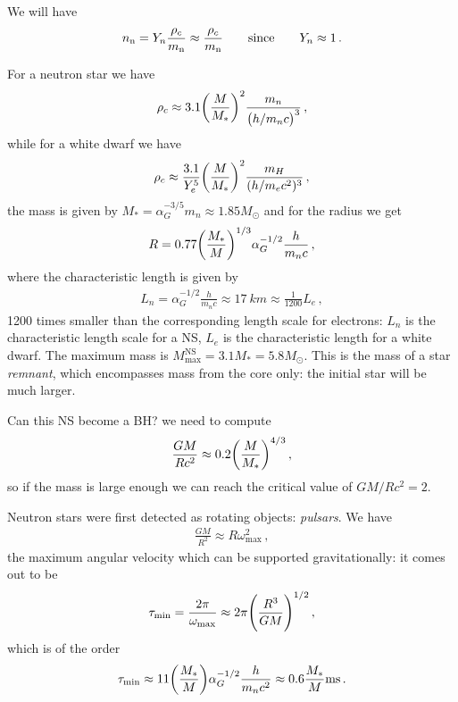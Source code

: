 \documentclass[main.tex]{subfiles}
\begin{document}
We will have 
%
\begin{align}
n_{\ce{n}} = Y_n \frac{\rho_{c}}{m_{\ce{n}}} \approx \frac{\rho_{c}}{m_{\ce{n}}} \qquad \text{since} \qquad Y_n \approx 1
\,.
\end{align}

For a neutron star we have 
%
\begin{align}
\rho_{c} \approx 3.1 \qty(\frac{M}{M_{*}})^2 \frac{m_n}{\qty(h / m_n c)^3}
\,,
\end{align}
%
while for a white dwarf we have 
%
\begin{align}
\rho_{c} \approx \frac{3.1}{Y_e^{5}} \qty(\frac{M}{M_{*}})^2 \frac{m_H}{(h / m_e c^2)^{3}}
\,,
\end{align}
%
the mass is given by \(M_{*} = \alpha_{G}^{-3 /5 } m_n \approx 1.85 M_{\odot}\) and for the radius we get 
%
\begin{align}
R = \num{.77} \qty(\frac{M_{*}}{M})^{1/3} \alpha_{G}^{-1/2}  \frac{h}{m_n c}
\,,
\end{align}
%
where the characteristic length is given by 
%
\begin{align}
L_n = \alpha_{G}^{-1/2} \frac{h}{m_n c} \approx \SI{17}{km} \approx \frac{1}{1200} L_e
\,,
\end{align}
%
1200 times smaller than the corresponding length scale for electrons: \(L_n\) is the characteristic length scale for a NS, \(L_e\) is the characteristic length for a white dwarf.
The maximum mass is \(M _{\text{max}}^{\text{NS}} = 3.1 M_{*} = 5.8 M_{\odot}\). 
This is the mass of a star \emph{remnant}, which encompasses mass from the core only: the initial star will be much larger. 

Can this NS become a BH? we need to compute 
%
\begin{align}
\frac{GM}{Rc^2} \approx \num{.2} \qty(\frac{M}{M_{*}})^{4/3}
\,,
\end{align}
%
so if the mass is large enough we can reach the critical value of \(GM / Rc^2 = 2\). 

Neutron stars were first detected as rotating objects: \emph{pulsars}. We have 
%
\begin{align}
\frac{GM}{R^2} \approx R \omega^2 _{\text{max}}
\,,
\end{align}
%
the maximum angular velocity which can be supported gravitationally: it comes out to be 
%
\begin{align}
\tau _{\text{min}} = \frac{2 \pi }{\omega _{\text{max}}} 
\approx 2 \pi \qty(\frac{R^3}{GM})^{1/2}
\,,
\end{align}
%
which is of the order 
%
\begin{align}
    \tau _{\text{min}} \approx 
    11 \qty(\frac{M_{*}}{M}) \alpha_{G}^{-1/2} \frac{h}{m_n c^2}
    \approx \num{.6} \frac{M_{*}}{M} \SI{}{ms}
    \,.
\end{align}
\end{document}
